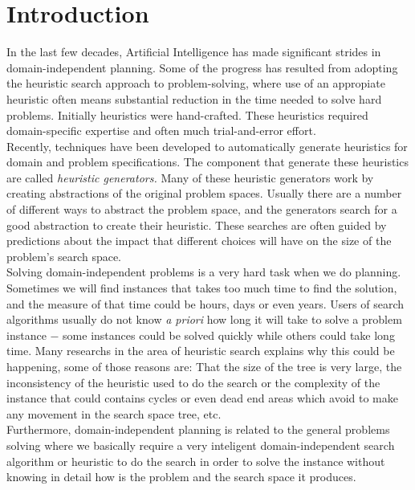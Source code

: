 \documentclass[a4paper,12pt]{article}
\begin{document}
\tableofcontents
\newpage

\section{Introduction}
In the last few decades, Artificial Intelligence has made significant strides in domain-independent planning. Some of the progress has resulted from adopting the heuristic search approach to problem-solving, where use of an appropiate heuristic often means substantial reduction in the time needed to solve hard problems. Initially heuristics were hand-crafted. These heuristics required domain-specific expertise and often much trial-and-error effort.\\

Recently, techniques \citep{haslum2007domain, edelkamp2007automated, nissim2011computing} have been developed to automatically generate heuristics for domain and problem specifications. The component that generate these heuristics are called \textit{heuristic generators.} Many of these heuristic generators work by creating abstractions of the original problem spaces. Usually there are a number of different ways to abstract the problem space, and the generators search for a good abstraction to create their heuristic. These searches are often guided by predictions about the impact that different choices will have on the size of the problem's search space.\\

Solving domain-independent problems is a very hard task when we do planning. Sometimes we will find instances that takes too much time to find the solution, and the measure of that time could be hours, days or even years. Users of search algorithms usually do not know \textit{a priori} how long it will take to solve a problem instance $-$ some instances could be solved quickly while others could take long time. Many researchs in the area of heuristic search explains why this could be happening, some of those reasons are: That the size of the tree is very large, the inconsistency of the heuristic used to do the search or the complexity of the instance that could contains cycles or even dead end areas which avoid to make any movement in the search space tree, etc.\\

Furthermore, domain-independent planning is related to the general problems solving where we basically require a very inteligent domain-independent search algorithm or heuristic to do the search in order to solve the instance without knowing in detail how is the problem and the search space it produces.\\
\end{document}
